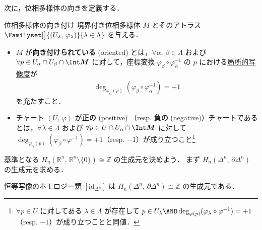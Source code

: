 \documentclass[algtopo_main]{subfiles}
\begin{document}
次に，位相多様体の向きを定義する．

\begin{mydef}[label=def:orientable]{位相多様体の向き付け}
    境界付き位相多様体 $M$ とそのアトラス $\Familyset[\big]{(U_\lambda,\, \varphi_\lambda)}{\lambda \in \Lambda}$ を与える．
\begin{itemize}
    \item 
    $M$ が\textbf{向き付けられている} (oriented) とは，$\forall \alpha,\, \beta \in \Lambda$ 
    および $\forall p \in U_\alpha \cap U_\beta \cap \bm{\Int M}$
    に対して，座標変換 $\varphi_\beta \circ \varphi_\alpha^{-1}$ の $p$ における\hyperref[def:loc-degree]{局所的写像度}が
    \begin{align}
        \deg_{\varphi_\alpha(p)} (\varphi_\beta \circ \varphi_\alpha^{-1}) = +1
    \end{align}
    を充たすこと．
    \item  チャート $(U,\, \varphi)$ が\textbf{正の} (positive) （resp. \textbf{負の} (negative)）チャートであるとは，$\forall \lambda \in \Lambda$ および $\forall p \in U \cap U_\alpha \cap \bm{\Int M}$ に対して $\deg_{\varphi_\alpha(p)} (\varphi_\beta \circ \varphi^{-1}) = +1$（resp. $-1$）が成り立つこと\footnote{$\forall p \in U$ に対してある $\lambda \in \Lambda$ が存在して $p \in U_\lambda \AND \deg_{\varphi(p)} (\varphi_\lambda \circ \varphi^{-1}) = +1$（resp. $-1$）が成り立つことと同値．}
\end{itemize}
\end{mydef}

基準となる $H_n(\mathbb{R}^n,\, \mathbb{R}^n\setminus \{0\}) \cong \mathbb{Z}$ の生成元を決めよう．
まず $H_n(\Delta^n,\, \partial \Delta^n)$ の生成元を求める．

\begin{mylem}[label=lem:generator-simplex]{}
    恒等写像のホモロジー類 $[\mathrm{id}_{\Delta^n}]$ は $H_n(\Delta^n,\, \partial \Delta^n) \cong \mathbb{Z}$ の生成元である．
\end{mylem}
\end{document}
